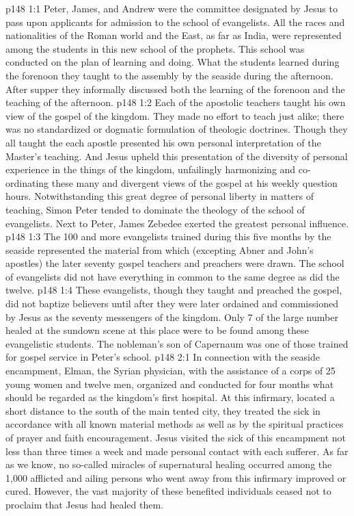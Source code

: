 \vs p148 1:1 Peter, James, and Andrew were the committee designated by Jesus to pass upon applicants for admission to the school of evangelists. All the races and nationalities of the Roman world and the East, as far as India, were represented among the students in this new school of the prophets. This school was conducted on the plan of learning and doing. What the students learned during the forenoon they taught to the assembly by the seaside during the afternoon. After supper they informally discussed both the learning of the forenoon and the teaching of the afternoon.
\vs p148 1:2 Each of the apostolic teachers taught his own view of the gospel of the kingdom. They made no effort to teach just alike; there was no standardized or dogmatic formulation of theologic doctrines. Though they all taught the  each apostle presented his own personal interpretation of the Master’s teaching. And Jesus upheld this presentation of the diversity of personal experience in the things of the kingdom, unfailingly harmonizing and co\hyp{}ordinating these many and divergent views of the gospel at his weekly question hours. Notwithstanding this great degree of personal liberty in matters of teaching, Simon Peter tended to dominate the theology of the school of evangelists. Next to Peter, James Zebedee exerted the greatest personal influence.
\vs p148 1:3 The 100 and more evangelists trained during this five months by the seaside represented the material from which (excepting Abner and John’s apostles) the later seventy gospel teachers and preachers were drawn. The school of evangelists did not have everything in common to the same degree as did the twelve.
\vs p148 1:4 These evangelists, though they taught and preached the gospel, did not baptize believers until after they were later ordained and commissioned by Jesus as the seventy messengers of the kingdom. Only 7 of the large number healed at the sundown scene at this place were to be found among these evangelistic students. The nobleman’s son of Capernaum was one of those trained for gospel service in Peter’s school.
\vs p148 2:1 In connection with the seaside encampment, Elman, the Syrian physician, with the assistance of a corps of 25 young women and twelve men, organized and conducted for four months what should be regarded as the kingdom’s first hospital. At this infirmary, located a short distance to the south of the main tented city, they treated the sick in accordance with all known material methods as well as by the spiritual practices of prayer and faith encouragement. Jesus visited the sick of this encampment not less than three times a week and made personal contact with each sufferer. As far as we know, no so\hyp{}called miracles of supernatural healing occurred among the 1,000 afflicted and ailing persons who went away from this infirmary improved or cured. However, the vast majority of these benefited individuals ceased not to proclaim that Jesus had healed them.

